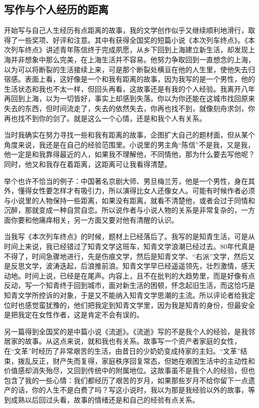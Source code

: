 \documentclass[12pt,a5paper]{ctexbook}
\begin{document}
\subsection{写作与个人经历的距离}
开始写与自己人生经历有点距离的故事，我的文学创作似乎又继续顺利地滑行，取得了一些奖项、好评和注意。其中有获得全国奖的短篇小说《本次列车终点》。《本次列车终点》讲述青年陈信终于完成夙愿，从乡下回到上海建立新生活，却发现上海并非想象中那么完美，在上海生活并不容易。他努力争取回到一直想念的上海，以为可以将断裂的生活接续上来，可是那个断裂处横亘在他的人生里，使他失去归宿感。表面上看，这好像是一个和我有距离的故事，因为我写的是一个男性，他的生活状态和我也不太一样，但回头再看，这故事还是有我的个人经验。我离开八年再回到上海，以为一切皆好，事实上却感到失落。你以为你还能在这城市找回原来失去的东西，但时间流走了，失去的依然失去，你再也找不到，就像刻舟求剑，你再也找不到你的剑了。就是这么一个心情，还是和我个人有关系。

当时我确实在努力寻找一些和我有距离的故事，企图扩大自己的题材面，但从某个角度来说，我还是在自己的经验范围里。小说里的男主角“陈信”不是我，又是我，他一定是和我靠得最近的人，如果我不理解他，不同情他，那为什么要去写他呢？同时，他又和我存在着距离，这距离可让我看得清楚。

举个也许不恰当的例子：中国著名京剧大师、男旦梅兰芳，他是一个男性，身在其外，懂得女性要怎样才有吸引力，所以演得比女人还像女人。可能有时候作者必须与小说里的人物保持一些距离，如果没有距离，就看不清楚他，或者会过于同情和沉醉，那就变成一种自赏自恋。所以说作者与小说人物的关系是非常复杂的，一方面你要和他痛痒相关，另一方面又要对他有清醒的认识。

当我写《本次列车终点》的时候，题材上已经落后了。我写的是知青生活，可是从时间上来说，我已经错过了知青文学这班车，知青文学浪潮已经过去。80年代真是不得了，时间急骤地进行，先是伤痕文学，然后是知青文学、“右派”文学，然后又是反思文学，波涛迭起，后浪推前浪。知青文学早已经遥遥领先，壮烈激情，感天动地。时间上说，已经是在尾声。内容上，且不在批判的大趋势里，而是好像有点反动，写一个知青终于回到城市，面对新生活的困顿，怀念起旧生活，而这恰巧是知青文学所控诉的对象，于是又不能纳入知青文学思潮的主流。所以评论者给我定位时也感觉蛮犹豫的，他们把我定到知青文学里，因为我是知青的身份，但最安全是把我定在女性作者，这是肯定不会有误的。

另一篇得到全国奖的是中篇小说《流逝》。《流逝》写的不是我个人的经验，是我邻居家的故事。从这点来说，就和我也有关系。故事写一个资产者家庭的女性，在“文革”时经历了非常艰苦的生活，由昔日的少奶奶变成持家的主妇。“文革”结束，拨乱反正，财产失而复得，家庭秩序回复常态，但她在艰困生活中的主动性和价值感却消失殆尽，又回到传统中的附属地位。这故事虽不是我个人的经验，但也包含了我的一些心情：我们都经历了艰苦的岁月，如果那些岁月不给你留下一点遗产的话，你的人生不是白费了吗？写这小说时，我以为那是我经验以外的故事，等到成熟以后回过头看，故事的情绪还是和自己的经验有点关系。
\end{document}
